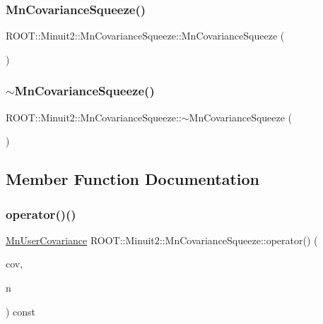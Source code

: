 \subsubsection{\texorpdfstring{MnCovarianceSqueeze()}{MnCovarianceSqueeze()}\hspace{0.1cm}{\footnotesize\ttfamily [3/3]}}
{\footnotesize\ttfamily R\+O\+O\+T\+::\+Minuit2\+::\+Mn\+Covariance\+Squeeze\+::\+Mn\+Covariance\+Squeeze (\begin{DoxyParamCaption}{ }\end{DoxyParamCaption})\hspace{0.3cm}{\ttfamily [inline]}}

\mbox{\label{classROOT_1_1Minuit2_1_1MnCovarianceSqueeze_a15e84b50e1ac75701a986f62e74d77d6}} 
\subsubsection{\texorpdfstring{$\sim$MnCovarianceSqueeze()}{~MnCovarianceSqueeze()}\hspace{0.1cm}{\footnotesize\ttfamily [3/3]}}
{\footnotesize\ttfamily R\+O\+O\+T\+::\+Minuit2\+::\+Mn\+Covariance\+Squeeze\+::$\sim$\+Mn\+Covariance\+Squeeze (\begin{DoxyParamCaption}{ }\end{DoxyParamCaption})\hspace{0.3cm}{\ttfamily [inline]}}



\subsection{Member Function Documentation}
\mbox{\label{classROOT_1_1Minuit2_1_1MnCovarianceSqueeze_af75da2b8e6e20a5477a6b0ceac4efb3a}} 
\subsubsection{\texorpdfstring{operator()()}{operator()()}\hspace{0.1cm}{\footnotesize\ttfamily [1/9]}}
{\footnotesize\ttfamily \mbox{\hyperlink{classROOT_1_1Minuit2_1_1MnUserCovariance}{Mn\+User\+Covariance}} R\+O\+O\+T\+::\+Minuit2\+::\+Mn\+Covariance\+Squeeze\+::operator() (\begin{DoxyParamCaption}\item[{const \mbox{\hyperlink{classROOT_1_1Minuit2_1_1MnUserCovariance}{Mn\+User\+Covariance}} \&}]{cov,  }\item[{unsigned int}]{n }\end{DoxyParamCaption}) const}

